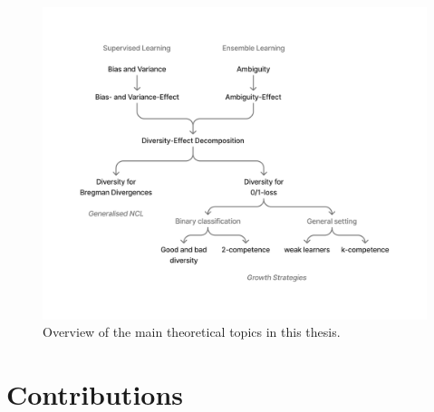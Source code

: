 \documentclass[
	twoside=false, %
]{kaobook}
\begin{document}


\begin{figure}[hb!]
  \includegraphics[width=\textwidth]{figma-illustrations/thesis-overview.pdf}
  \caption{Overview of the main theoretical topics in this thesis.}
  \label{fig:overview}
\end{figure}

\section{Contributions}
\label{sec:contributions}
\end{document}
